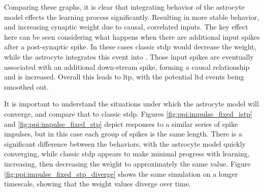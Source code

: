 Comparing these graphs, it is clear that integrating behavior of the astrocyte
model effects the learning process significantly. Resulting in more stable
behavior, and increasing synaptic weight due to causal, correlated inputs. The
key effect here can be seen considering what happens when there are additional
input spikes after a post-synaptic spike. In these cases classic \gls{stdp}
would decrease the weight, while the astrocyte integrates this event into
\ca. Those input spikes are eventually associated with an additional down-stream
spike, forming a causal relationship and \ca is increased. Overall this leads to
\gls{ltp}, with the potential \gls{ltd} events being smoothed out.



It is important to understand the situations under which the astrocyte model
will converge, and compare that to classic \gls{stdp}. Figures
\ref{fig:ppi:impulse_fixed_istp} and \ref{fig:ppi:impulse_fixed_stp} depict
responses to a similar series of spike impulses, but in this case each group of
spikes is the same length. There is a significant difference between the
behaviors, with the astrocyte model quickly converging, while
classic \gls{stdp} appears to make minimal progress with learning, increasing,
then decreasing the weight to approximately the same value. Figure
\ref{fig:ppi:impulse_fixed_stp_diverge} shows the same simulation on a longer
timescale, showing that the weight values diverge over time.





